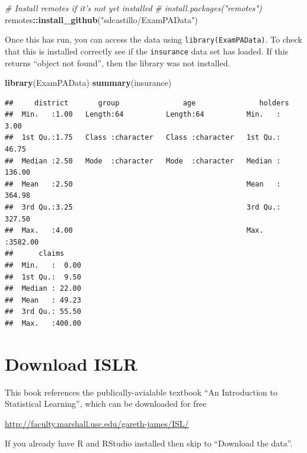 \documentclass[openany]{book}
\newenvironment{Shaded}{\begin{snugshade}}{\end{snugshade}}
\newcommand{\CommentTok}[1]{\textcolor[rgb]{0.56,0.35,0.01}{\textit{#1}}}
\newcommand{\KeywordTok}[1]{\textcolor[rgb]{0.13,0.29,0.53}{\textbf{#1}}}
\newcommand{\NormalTok}[1]{#1}
\newcommand{\OperatorTok}[1]{\textcolor[rgb]{0.81,0.36,0.00}{\textbf{#1}}}
\newcommand{\StringTok}[1]{\textcolor[rgb]{0.31,0.60,0.02}{#1}}
\begin{document}
\begin{Shaded}
\begin{Highlighting}[]
\CommentTok{# Install remotes if it's not yet installed}
\CommentTok{# install.packages("remotes")}
\NormalTok{remotes}\OperatorTok{::}\KeywordTok{install_github}\NormalTok{(}\StringTok{"sdcastillo/ExamPAData"}\NormalTok{)}
\end{Highlighting}
\end{Shaded}

Once this has run, you can access the data using \texttt{library(ExamPAData)}. To check that this is installed correctly see if the \texttt{insurance} data set has loaded. If this returns ``object not found'', then the library was not installed.

\begin{Shaded}
\begin{Highlighting}[]
\KeywordTok{library}\NormalTok{(ExamPAData)}
\KeywordTok{summary}\NormalTok{(insurance)}
\end{Highlighting}
\end{Shaded}

\begin{verbatim}
##     district       group               age               holders       
##  Min.   :1.00   Length:64          Length:64          Min.   :   3.00  
##  1st Qu.:1.75   Class :character   Class :character   1st Qu.:  46.75  
##  Median :2.50   Mode  :character   Mode  :character   Median : 136.00  
##  Mean   :2.50                                         Mean   : 364.98  
##  3rd Qu.:3.25                                         3rd Qu.: 327.50  
##  Max.   :4.00                                         Max.   :3582.00  
##      claims      
##  Min.   :  0.00  
##  1st Qu.:  9.50  
##  Median : 22.00  
##  Mean   : 49.23  
##  3rd Qu.: 55.50  
##  Max.   :400.00
\end{verbatim}

\hypertarget{download-islr}{%
\section{Download ISLR}\label{download-islr}}

This book references the publically-avialable textbook ``An Introduction to Statistical Learning'', which can be downloaded for free

\url{http://faculty.marshall.usc.edu/gareth-james/ISL/}

If you already have R and RStudio installed then skip to ``Download the data''.
\end{document}
